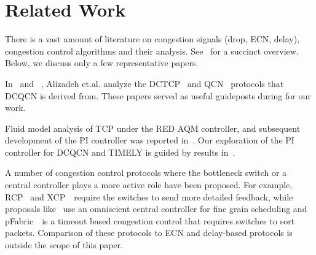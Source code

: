 \vspace{-0.5em}
\section{Related Work}
\label{sec:related}

There is a vast amount of literature on congestion signals (drop, ECN, delay),
congestion control algorithms and their analysis. See~\cite{srikantbook} for a
succinct overview. Below, we discuss only a few representative papers.

In~\cite{dctcp-analysis} and ~\cite{qcn-analysis}, Alizadeh et.al. analyze the
DCTCP~\cite{dctcp} and QCN~\cite{qcn} protocols that DCQCN is derived from.
These papers served as useful guideposts during for our work.

Fluid model analysis of TCP under the RED AQM controller, and subsequent
development of the PI controller was reported
in~\cite{misra2000fluid,hollot2001designing}. Our exploration of the PI
controller for DCQCN and TIMELY is guided by results
in~\cite{hollot2001designing}.

A number of congestion control protocols where the bottleneck switch or a
central controller plays a more active role have been proposed.  For example,
RCP~\cite{dukkipati2006rcp} and XCP~\cite{katabi2002congestion}~require the
switches to send more detailed feedback, while proposals
like~\cite{vattikonda2012practical,deadline,perry2014fastpass} use an omniscient
central controller for fine grain scheduling and pFabric~\cite{pfabric}~is a
timeout based congestion control that requires switches to sort packets.
Comparison of these protocols to ECN and delay-based protocols is outside the
scope of this paper.



